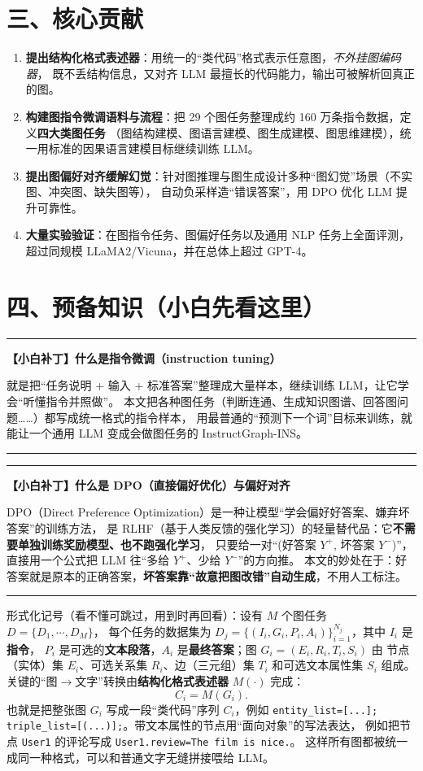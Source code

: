 \documentclass[11pt,UTF8,fontset=fandol]{ctexart}
\newenvironment{tip}[1]{%
  \par\smallskip\noindent\rule{\linewidth}{0.4pt}\par\nobreak
  \noindent\textbf{【小白补丁】#1}\par\nobreak\noindent\ignorespaces
}{%
  \par\noindent\rule{\linewidth}{0.4pt}\par\smallskip
}
\begin{document}
\section{三、核心贡献}
\begin{enumerate}[leftmargin=2em]
  \item \textbf{提出结构化格式表述器}：用统一的“类代码”格式表示任意图，\emph{不外挂图编码器}，
        既不丢结构信息，又对齐 LLM 最擅长的代码能力，输出可被解析回真正的图。
  \item \textbf{构建图指令微调语料与流程}：把 29 个图任务整理成约 160 万条指令数据，定义\textbf{四大类图任务}
        （图结构建模、图语言建模、图生成建模、图思维建模），统一用标准的因果语言建模目标继续训练 LLM。
  \item \textbf{提出图偏好对齐缓解幻觉}：针对图推理与图生成设计多种“图幻觉”场景（不实图、冲突图、缺失图等），
        自动负采样造“错误答案”，用 DPO 优化 LLM 提升可靠性。
  \item \textbf{大量实验验证}：在图指令任务、图偏好任务以及通用 NLP 任务上全面评测，
        超过同规模 LLaMA2/Vicuna，并在总体上超过 GPT-4。
\end{enumerate}

\section{四、预备知识（小白先看这里）}

\begin{tip}{什么是指令微调（instruction tuning）}
就是把“任务说明 + 输入 + 标准答案”整理成大量样本，继续训练 LLM，让它学会“听懂指令并照做”。
本文把各种图任务（判断连通、生成知识图谱、回答图问题……）都写成统一格式的指令样本，
用最普通的“预测下一个词”目标来训练，就能让一个通用 LLM 变成会做图任务的 InstructGraph-INS。
\end{tip}

\begin{tip}{什么是 DPO（直接偏好优化）与偏好对齐}
DPO（Direct Preference Optimization）是一种让模型“学会偏好好答案、嫌弃坏答案”的训练方法，
是 RLHF（基于人类反馈的强化学习）的轻量替代品：它\textbf{不需要单独训练奖励模型、也不跑强化学习}，
只要给一对“(好答案 $Y^+$, 坏答案 $Y^-$)”，直接用一个公式把 LLM 往“多给 $Y^+$、少给 $Y^-$”的方向推。
本文的妙处在于：好答案就是原本的正确答案，\textbf{坏答案靠“故意把图改错”自动生成}，不用人工标注。
\end{tip}

形式化记号（看不懂可跳过，用到时再回看）：设有 $M$ 个图任务 $D=\{D_1,\cdots,D_M\}$，
每个任务的数据集为 $D_j=\{(I_i,G_i,P_i,A_i)\}_{i=1}^{N_j}$，其中 $I_i$ 是\textbf{指令}，
$P_i$ 是可选的\textbf{文本段落}，$A_i$ 是\textbf{最终答案}；图 $G_i=(E_i,R_i,T_i,S_i)$ 由
节点（实体）集 $E_i$、可选关系集 $R_i$、边（三元组）集 $T_i$ 和可选文本属性集 $S_i$ 组成。
关键的“图$\to$文字”转换由\textbf{结构化格式表述器} $M(\cdot)$ 完成：
\begin{equation*}
  C_i = M(G_i). \tag{$\ast$}
\end{equation*}
也就是把整张图 $G_i$ 写成一段“类代码”序列 $C_i$，例如
\texttt{entity\_list=[...]; triple\_list=[(...)];}。带文本属性的节点用“面向对象”的写法表达，
例如把节点 \texttt{User1} 的评论写成 \texttt{User1.review=The film is nice.}。
这样所有图都被统一成同一种格式，可以和普通文字无缝拼接喂给 LLM。
\end{document}
